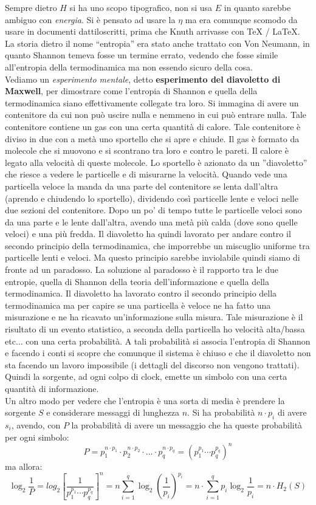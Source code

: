 \documentclass[a4paper,12pt, oneside]{book}
\begin{document}
Sempre dietro $H$ si ha uno scopo tipografico, non si usa $E$ in quanto sarebbe
ambiguo con \textit{energia}. Si è pensato ad usare la $\eta$ ma era comunque
scomodo da usare in documenti dattiloscritti, prima che Knuth arrivasse con \TeX
/ \LaTeX.\\
La storia dietro il nome ``entropia'' era stato anche trattato con Von Neumann,
in quanto Shannon temeva fosse un termine errato, vedendo che fosse simile
all'entropia della termodinamica ma non essendo sicuro della cosa.\\
Vediamo un \textit{esperimento mentale}, detto \textbf{esperimento del
  diavoletto di Maxwell}, per dimostrare come l'entropia di Shannon e quella
della termodinamica siano effettivamente collegate tra loro. Si immagina di
avere un contenitore da cui non può uscire nulla e nemmeno in cui può entrare
nulla. Tale contenitore contiene un gas con una certa quantità di calore. Tale
contenitore è diviso in due con a metà uno sportello che si apre e chiude. Il
gas è formato da molecole che si muovono e si scontrano tra loro e contro le
pareti. Il calore è legato alla velocità di queste molecole. Lo sportello è
azionato da un ''diavoletto'' che riesce a vedere le particelle e di misurarne
la velocità. Quando vede una particella veloce la manda da una parte del
contenitore se lenta dall'altra (aprendo e chiudendo lo sportello), dividendo
così particelle lente e veloci nelle due sezioni del contenitore. Dopo un po' di
tempo tutte le particelle veloci sono da una parte e le lente dall'altra, avendo
una metà più calda (dove sono quelle veloci) e una più fredda. Il diavoletto ha
quindi lavorato per andare contro il secondo principio della termodinamica, che
imporrebbe un miscuglio uniforme tra particelle lenti e veloci. Ma questo
principio sarebbe inviolabile quindi siamo di fronte ad un paradosso. La
soluzione al paradosso è il rapporto tra le due entropie, quella di Shannon
della teoria dell'informazione e quella della termodinamica. Il diavoletto
ha lavorato contro il secondo principio della termodinamica ma per capire se una
particella è veloce ne ha fatto una misurazione e ne ha ricavato un'informazione
sulla misura. Tale misurazione è il risultato di un evento statistico, a seconda
della particella ho velocità alta/bassa etc$\ldots$ con una certa probabilità. A
tali probabilità si associa l'entropia di Shannon e facendo i conti si scopre
che comunque il sistema è chiuso e che il diavoletto non sta facendo un lavoro
impossibile (i dettagli del discorso non vengono trattati).\\
Quindi la sorgente, ad ogni colpo di clock, emette un simbolo con una certa
quantità di informazione. \\
Un altro modo per vedere che l'entropia è una sorta di media è prendere la
sorgente $S$ e considerare messaggi di lunghezza $n$. Si ha probabilità $n\cdot
p_i$ di avere $s_i$, avendo, con $P$ la probabilità di avere un messaggio che ha
queste probabilità per ogni simbolo: 
\[P=p_1^{n\cdot p_1}\cdot p_2^{n\cdot p_2}\cdot \ldots \cdot p_q^{n\cdot
    p_q}=(p_1^{p_1}\cdots p_q^{p_q})^n\]
ma allora:
\[\log_2\frac{1}{P}=log_2\left[\frac{1}{p_1^{p_1}\cdots
      p_q^{p_q}}\right]^n=n\sum_{i=1}^q\log_2\left(\frac{1}{p_i}\right)^{p_i}=n\cdot
  \sum_{i=1}^qp_i\log_2\frac{1}{p_i}=n\cdot H_2(S)\]
\end{document}
